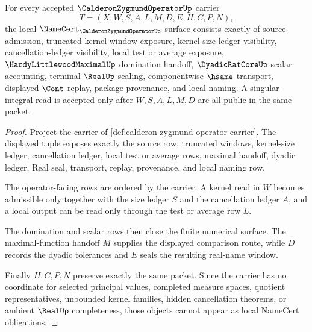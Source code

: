 \begin{theorem}
\label{thm:calderon-zygmund-operator-namecert-obligations}
For every accepted $\CalderonZygmundOperatorUp$ carrier
$$
T=(X,W,S,A,L,M,D,E,H,C,P,N),
$$
the local $\NameCert_{\CalderonZygmundOperatorUp}$ surface consists exactly of source admission, truncated kernel-window exposure, kernel-size ledger visibility, cancellation-ledger visibility, local test or average exposure, $\HardyLittlewoodMaximalUp$ domination handoff, $\DyadicRatCoreUp$ scalar accounting, terminal $\RealUp$ sealing, componentwise $\hsame$ transport, displayed $\Cont$ replay, package provenance, and local naming. A singular-integral read is accepted only after $W,S,A,L,M,D$ are all public in the same packet.
\end{theorem}
\begin{proof}
Project the carrier of \autoref{def:calderon-zygmund-operator-carrier}. The displayed tuple exposes exactly the source row, truncated windows, kernel-size ledger, cancellation ledger, local test or average rows, maximal handoff, dyadic ledger, Real seal, transport, replay, provenance, and local naming row.

The operator-facing rows are ordered by the carrier. A kernel read in $W$ becomes admissible only together with the size ledger $S$ and the cancellation ledger $A$, and a local output can be read only through the test or average row $L$.

The domination and scalar rows then close the finite numerical surface. The maximal-function handoff $M$ supplies the displayed comparison route, while $D$ records the dyadic tolerances and $E$ seals the resulting real-name window.

Finally $H,C,P,N$ preserve exactly the same packet. Since the carrier has no coordinate for selected principal values, completed measure spaces, quotient representatives, unbounded kernel families, hidden cancellation theorems, or ambient $\RealUp$ completeness, those objects cannot appear as local NameCert obligations.
\end{proof}

